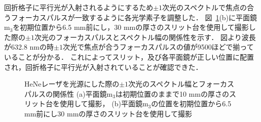 回折格子に平行光が入射されるようにするため$\pm{1}$次光のスペクトルで焦点の合うフォーカスパルスが一致するように各光学素子を調整した．
図\ \ref{fig:HeNe_focus}(b)に平面鏡$\mathrm{m_3}$を初期位置から6.5 mm前にし，30 mmの厚さのスリット台を使用して撮影した際の$\pm{1}$次光のフォーカスパルスとスペクトル幅の関係性を示す．
図より波長が632.8 nmの時$\pm{1}$次光で焦点が合うフォーカスパルスの値が9500ほどで揃っていることが分かる．
これによってスリット，及び各平面鏡が正しい位置に配置され，回折格子に平行光が入射されていることが確認できた．
\begin{figure}
    \caption{HeNeレーザを光源にした際の$\pm{1}$次光のスペクトル幅とフォーカスパルスの関係性
    (a)平面鏡$\mathrm{m_3}$は初期位置のままで10 mmの厚さのスリット台を使用して撮影，
    (b)平面鏡$\mathrm{m_3}$の位置を初期位置から6.5 mm前にし30 mmの厚さのスリット台を使用して撮影}
    \label{fig:HeNe_focus}
\end{figure}

